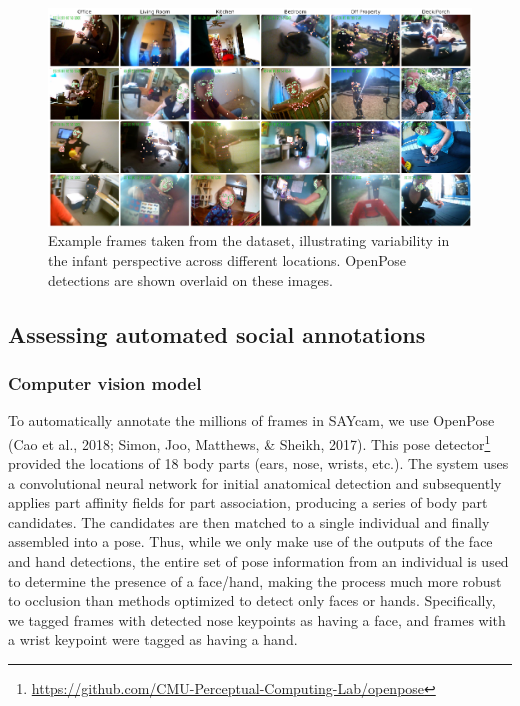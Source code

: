 \documentclass[10pt, letterpaper]{article}
\newenvironment{CodeChunk}{}{}
\begin{document}
\begin{CodeChunk}
\begin{figure}[h]

{\centering \includegraphics{figs/examples-1} 

}

\caption[Example frames taken from the dataset, illustrating variability in the infant perspective across different locations]{Example frames taken from the dataset, illustrating variability in the infant perspective across different locations. OpenPose detections are shown overlaid on these images.}\label{fig:examples}
\end{figure}
\end{CodeChunk}

\subsection{Assessing automated social
annotations}\label{assessing-automated-social-annotations}

\subsubsection{Computer vision model}\label{computer-vision-model}

To automatically annotate the millions of frames in SAYcam, we use
OpenPose (Cao et al., 2018; Simon, Joo, Matthews, \& Sheikh, 2017). This
pose detector\footnote{\url{https://github.com/CMU-Perceptual-Computing-Lab/openpose}}
provided the locations of 18 body parts (ears, nose, wrists, etc.). The
system uses a convolutional neural network for initial anatomical
detection and subsequently applies part affinity fields for part
association, producing a series of body part candidates. The candidates
are then matched to a single individual and finally assembled into a
pose. Thus, while we only make use of the outputs of the face and hand
detections, the entire set of pose information from an individual is
used to determine the presence of a face/hand, making the process much
more robust to occlusion than methods optimized to detect only faces or
hands. Specifically, we tagged frames with detected nose keypoints as
having a face, and frames with a wrist keypoint were tagged as having a
hand.
\end{document}

